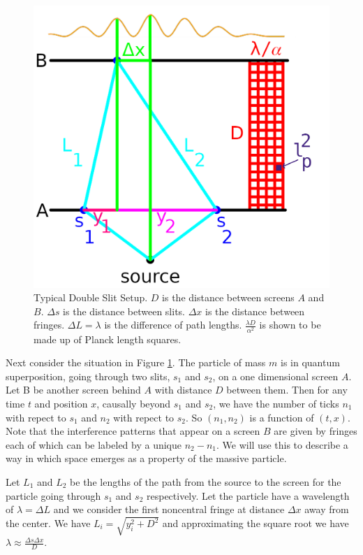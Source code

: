 \documentclass[12pt,a4paper]{article}
\begin{document}
\begin{figure}[h!]
\centering
\includegraphics[scale=0.5]{double_slit.png}
\caption{Typical Double Slit Setup.  $D$ is the distance between screens $A$ and $B$. $\Delta s$ is the distance between slits.  $\Delta x$ is the distance between fringes. $\Delta L = \lambda$ is the difference of path lengths.  $\frac{\lambda D}{\alpha^2}$ is shown to be made up of Planck length squares.}
\label{screen}
\end{figure}


Next consider the situation in Figure \ref{screen}.  The particle of mass $m$ is in quantum superposition, going through two slits, $s_1$ and $s_2$, on a one dimensional screen $A$. Let B be another screen behind $A$ with distance $D$ between them. Then for any time $t$ and position $x$, causally beyond $s_1$ and $s_2$, we have the number of ticks $n_1$ with repect to $s_1$ and $n_2$ with repect to $s_2$. So $(n_1,n_2)$ is a function of $(t,x)$. Note that the interference patterns that appear on a screen $B$ are given by fringes each of which can be labeled by a unique $n_2 - n_1$. We will use this to describe a way in which space emerges as a property of the massive particle. 

Let $L_1$ and $L_2$ be the lengths of the path from the source to the screen for the particle going through $s_1$ and $s_2$ respectively. Let the particle have a wavelength of $\lambda = \Delta L$ and we consider the first noncentral fringe at distance $\Delta x$ away from the center.  We have $L_i = \sqrt{y_i^2 + D^2}$ and approximating the square root we have $\lambda \approx \frac{\Delta s \Delta x}{D}$.
\end{document}
